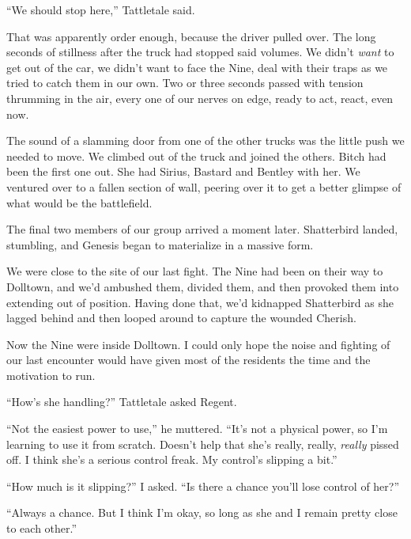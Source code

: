 ``We should stop here,'' Tattletale said.



That was apparently order enough, because the driver pulled over.  The long seconds of stillness after the truck had stopped said volumes.  We didn't \emph{want} to get out of the car, we didn't want to face the Nine, deal with their traps as we tried to catch them in our own.  Two or three seconds passed with tension thrumming in the air, every one of our nerves on edge, ready to act, react, even now.



The sound of a slamming door from one of the other trucks was the little push we needed to move.  We climbed out of the truck and joined the others.  Bitch had been the first one out.  She had Sirius, Bastard and Bentley with her.  We ventured over to a fallen section of wall, peering over it to get a better glimpse of what would be the battlefield.



The final two members of our group arrived a moment later.  Shatterbird landed, stumbling, and Genesis began to materialize in a massive form.



We were close to the site of our last fight.  The Nine had been on their way to Dolltown, and we'd ambushed them, divided them, and then provoked them into extending out of position.  Having done that, we'd kidnapped Shatterbird as she lagged behind and then looped around to capture the wounded Cherish.



Now the Nine were inside Dolltown.  I could only hope the noise and fighting of our last encounter would have given most of the residents the time and the motivation to run.



``How's she handling?'' Tattletale asked Regent.



``Not the easiest power to use,'' he muttered.  ``It's not a physical power, so I'm learning to use it from scratch.  Doesn't help that she's really, really, \emph{really} pissed off.  I think she's a serious control freak.  My control's slipping a bit.''



``How much is it slipping?'' I asked.  ``Is there a chance you'll lose control of her?''



``Always a chance.  But I think I'm okay, so long as she and I remain pretty close to each other.''



